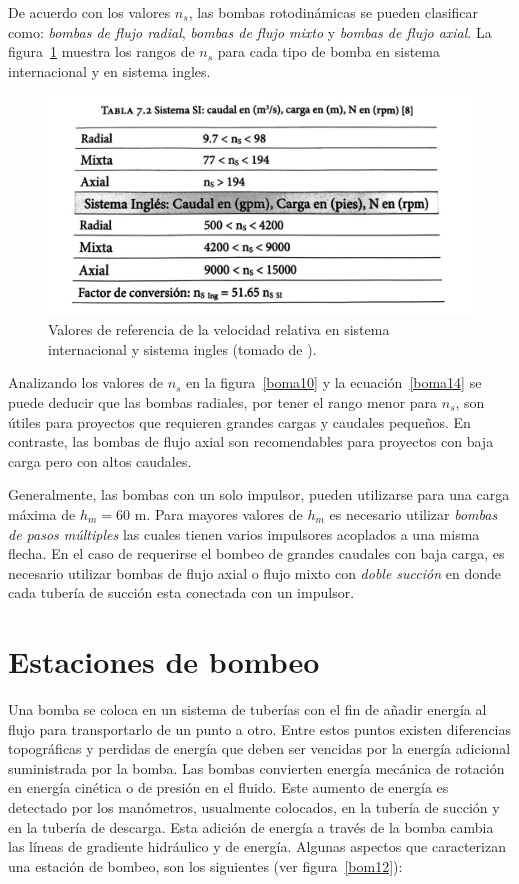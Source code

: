 \documentclass[11pt, oneside]{article}
\begin{document}
De acuerdo con los valores $n_s$, las bombas rotodin\'amicas se pueden clasificar como: \emph{bombas de flujo radial}, \emph{bombas de flujo mixto} y \emph{bombas de flujo axial}.  La figura~\ref{bom10} muestra los rangos de $n_s$ para cada tipo de bomba en sistema internacional y en sistema ingles.

\begin{figure}[h]
\centering
\includegraphics[width=12cm]{./figs/bom10.jpeg}
\caption{Valores de referencia de la velocidad relativa en sistema internacional y sistema ingles (tomado de \cite{agudelo2011mecanica}).} 
\label{bom10}
\end{figure}


Analizando los valores de $n_s$ en la figura~\ref{boma10} y la ecuaci\'on~\ref{boma14} se puede deducir  que las bombas radiales, por tener el rango menor para $n_s$, son \'utiles para proyectos que requieren grandes cargas y caudales peque\~nos. En contraste, las bombas de flujo axial son recomendables para proyectos con baja carga pero con altos caudales.  

Generalmente, las bombas con un solo impulsor, pueden utilizarse para una carga m\'axima de $h_m = 60$ m. Para mayores valores de $h_m$ es necesario utilizar \emph{bombas de pasos m\'ultiples} las cuales tienen varios impulsores acoplados a una misma flecha. En el caso de requerirse el bombeo de grandes caudales con baja carga, es necesario utilizar bombas de flujo axial o flujo mixto con \emph{doble succi\'on} en donde cada tuber\'ia de succi\'on esta conectada con un impulsor. 

\section{Estaciones de bombeo}
Una bomba se coloca en un sistema de tuber\'ias con el fin de a\~nadir energ\'ia al flujo para transportarlo de un punto a otro. Entre estos puntos existen diferencias topogr\'aficas y perdidas de energ\'ia que deben ser vencidas por la energ\'ia adicional suministrada por la bomba. Las bombas convierten energ\'ia mec\'anica de rotaci\'on en energ\'ia cin\'etica o de presi\'on en el fluido. Este aumento de energ\'ia es detectado por los man\'ometros, usualmente colocados, en la tuber\'ia de succi\'on y en la tuber\'ia de descarga. Esta adici\'on de energ\'ia a trav\'es de la bomba cambia las l\'ineas de gradiente hidr\'aulico y de energ\'ia. Algunas aspectos que caracterizan una estaci\'on de bombeo, son los siguientes (ver figura~\ref{bom12}):
\end{document}
